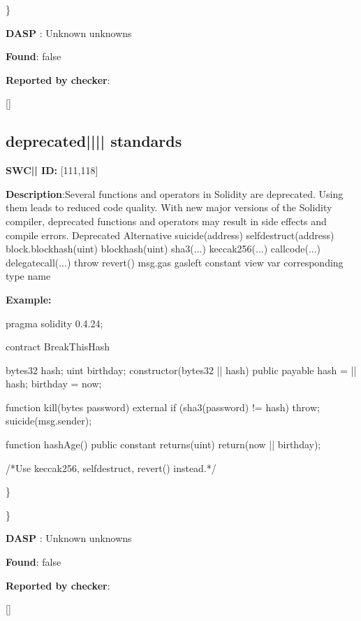\documentclass{article}
\begin{document}
\} 

\textbf{DASP} : Unknown unknowns

\textbf{Found}: false

\textbf{Reported by checker}: 
\begin{ffcode} 

[]
\end{ffcode} 
\subsection{deprecated{||\textunderscore|| }standards} 
\textbf{SWC{|\textunderscore| }ID:} [111,118]

\textbf{Description}:Several functions and operators in Solidity are deprecated. Using them leads to reduced code quality. With new major versions of the Solidity compiler, deprecated functions and operators may result in side effects and compile errors.
  Deprecated              Alternative
  suicide(address)        selfdestruct(address)
  block.blockhash(uint)   blockhash(uint)
  sha3(...)               keccak256(...)
  callcode(...)           delegatecall(...)
  throw                   revert()
  msg.gas                 gasleft
  constant                view
  var                     corresponding type name


\textbf{Example:} 
\begin{ffcode} 

pragma solidity 0.4.24;

contract BreakThisHash {
    bytes32 hash;
    uint birthday;
    constructor(bytes32 |\textunderscore| hash) public payable {
        hash = |\textunderscore| hash;
        birthday = now;
    }

    function kill(bytes password) external {
        if (sha3(password) != hash) {
            throw;
        }
        suicide(msg.sender);
    }

    function hashAge() public constant returns(uint) {
        return(now |\textendash|  birthday);
    }
}

 /*Use keccak256, selfdestruct, revert() instead.*/ 

\end{ffcode} 
\} 

\} 

\textbf{DASP} : Unknown unknowns

\textbf{Found}: false

\textbf{Reported by checker}: 
\begin{ffcode} 

[]
\end{ffcode} 
\end{document}
